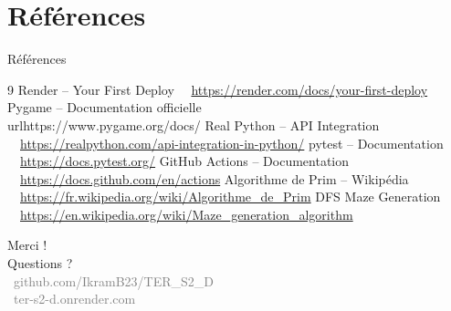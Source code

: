 \documentclass[aspectratio=169, 12pt]{beamer}
\begin{document}
\section*{Références}

\begin{frame}{Références}
\scriptsize
\setlength{\itemsep}{0pt}
\begin{thebibliography}{9}
     Render -- Your First Deploy ~~\url{https://render.com/docs/your-first-deploy}
     Pygame -- Documentation officielle ~~\\url{https://www.pygame.org/docs/}
     Real Python -- API Integration ~~\url{https://realpython.com/api-integration-in-python/}
     pytest -- Documentation ~~\url{https://docs.pytest.org/}
     GitHub Actions -- Documentation ~~\url{https://docs.github.com/en/actions}
     Algorithme de Prim -- Wikipédia ~~\url{https://fr.wikipedia.org/wiki/Algorithme_de_Prim}
     DFS Maze Generation ~~\url{https://en.wikipedia.org/wiki/Maze_generation_algorithm}
\end{thebibliography}
\end{frame}

\begin{frame}{}
\centering
\vspace{2cm}
{\Huge\textcolor{ucablue}{Merci !}}\\[1cm]
{\large Questions ?}\\[0.5cm]
{\small\textcolor{gray}{\faGithub~github.com/IkramB23/TER\_S2\_D}}\\
{\small\textcolor{gray}{\faGlobe~ter-s2-d.onrender.com}}
\end{frame}
\end{document}

